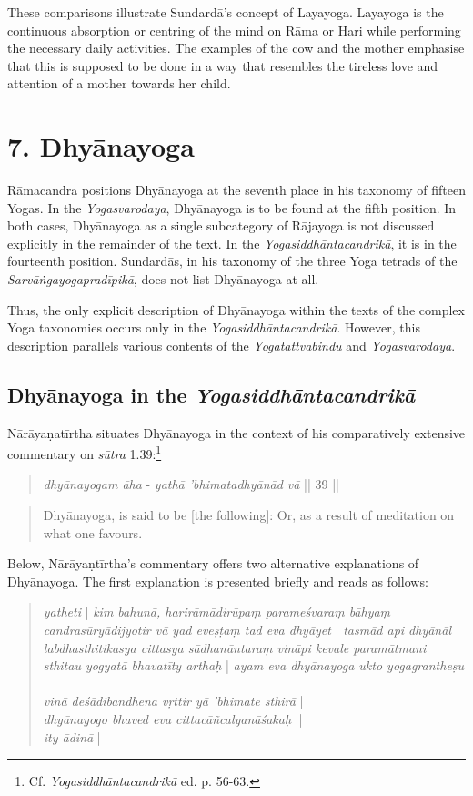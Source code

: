 These comparisons illustrate Sundardā's concept of Layayoga. Layayoga is the continuous absorption or centring of the mind on Rāma or Hari while performing the necessary daily activities. The examples of the cow and the mother emphasise that this is supposed to be done in a way that resembles the tireless love and attention of a mother towards her child.

\section{7. Dhyānayoga}
\label{dhyānayogaintro}

Rāmacandra positions Dhyānayoga at the seventh place in his taxonomy of fifteen Yogas. In the \textit{Yogasvarodaya}, Dhyānayoga is to be found at the fifth position. In both cases, Dhyānayoga as a single subcategory of Rājayoga is not discussed explicitly in the remainder of the text. In the \textit{Yogasiddhāntacandrikā}, it is in the fourteenth position. Sundardās, in his taxonomy of the three Yoga tetrads of the \textit{Sarvāṅgayogapradīpikā}, does not list Dhyānayoga at all.

Thus, the only explicit description of Dhyānayoga within the texts of the complex Yoga taxonomies occurs only in the \textit{Yogasiddhāntacandrikā}. However, this description parallels various contents of the \textit{Yogatattvabindu} and \textit{Yogasvarodaya}.   

\subsection{Dhyānayoga in the \textit{Yogasiddhāntacandrikā}}

Nārāyaṇatīrtha situates Dhyānayoga in the context of his comparatively extensive commentary on \textit{sūtra} 1.39:\footnote{Cf. \emph{Yogasiddhāntacandrikā} ed. p. 56-63.}

\begin{quote}
\textit{dhyānayogam āha} - 
\textit{yathā 'bhimatadhyānād vā} || 39 ||
\end{quote}
\begin{quote}
Dhyānayoga, is said to be [the following]:
 Or, as a result of meditation on what one favours.
\end{quote}

Below, Nārāyaṇtīrtha's commentary offers two alternative explanations of Dhyānayoga. The first explanation is presented briefly and reads as follows: 

\begin{quote}
  \textit{yatheti} | \textit{kim bahunā, harirāmādirūpaṃ parameśvaraṃ bāhyaṃ candrasūryādijyotir vā yad eveṣṭaṃ tad eva dhyāyet} | \textit{tasmād api dhyānāl labdhasthitikasya cittasya sādhanāntaraṃ vināpi kevale paramātmani sthitau yogyatā bhavatīty arthaḥ} | \textit{ayam eva dhyānayoga ukto yogagrantheṣu} |\\
  
  \textit{vinā deśādibandhena vṛttir yā 'bhimate sthirā} |\\
  \textit{dhyānayogo bhaved eva cittacāñcalyanāśakaḥ} ||\\
    \textit{ity ādinā} | 
\end{quote}

